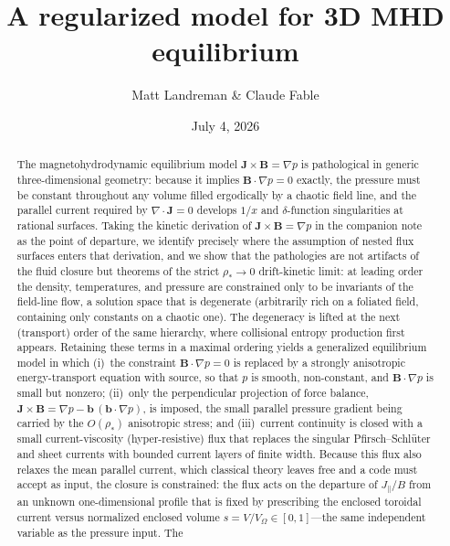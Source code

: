 \documentclass[english]{article}
\newcommand{\bB}{\mathbf{B}}
\newcommand{\bJ}{\mathbf{J}}
\newcommand{\bb}{\mathbf{b}}
\begin{document}
\title{A regularized model for 3D MHD equilibrium}
\author{Matt Landreman \& Claude Fable}
\date{July 4, 2026}
\maketitle

\begin{abstract}
The magnetohydrodynamic equilibrium model $\bJ\times\bB=\nabla p$ is pathological in generic
three-dimensional geometry: because it implies $\bB\cdot\nabla p=0$ exactly, the pressure must be
constant throughout any volume filled ergodically by a chaotic field line, and the parallel current
required by $\nabla\cdot\bJ=0$ develops $1/x$ and $\delta$-function singularities at rational
surfaces. Taking the kinetic derivation of $\bJ\times\bB=\nabla p$ in the companion
note~\cite{landreman_note} as the point of departure, we identify precisely where the assumption
of nested flux surfaces enters that derivation, and we show that the pathologies are not artifacts
of the fluid closure but theorems of the strict $\rho_*\rightarrow0$ drift-kinetic limit: at
leading order the density, temperatures, and pressure are constrained only to be invariants of the
field-line flow, a solution space that is degenerate (arbitrarily rich on a foliated field,
containing only constants on a chaotic one). The degeneracy is lifted at the next (transport) order
of the same hierarchy, where collisional entropy production first appears. Retaining these terms in
a maximal ordering yields a generalized equilibrium model in which (i)~the constraint
$\bB\cdot\nabla p=0$ is replaced by a strongly anisotropic energy-transport equation with source,
so that $p$ is smooth, non-constant, and $\bB\cdot\nabla p$ is small but nonzero; (ii)~only the
perpendicular projection of force balance, $\bJ\times\bB=\nabla p-\bb\,(\bb\cdot\nabla p)$, is
imposed, the small parallel pressure gradient being carried by the $O(\rho_*)$ anisotropic stress;
and (iii)~current continuity is closed with a small current-viscosity (hyper-resistive) flux that
replaces the singular Pfirsch--Schl\"uter and sheet currents with bounded current layers of finite
width. Because this flux also relaxes the mean parallel current, which classical theory leaves free
and a code must accept as input, the closure is constrained: the flux acts on the departure of
$J_\parallel/B$ from an unknown one-dimensional profile that is fixed by prescribing the enclosed
toroidal current versus normalized enclosed volume $s=V/V_\Omega\in[0,1]$---the same independent
variable as the pressure input. The

\end{abstract}
\end{document}
